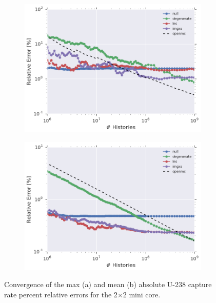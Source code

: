 \documentclass[12pt,twoside]{mitthesis-exec}
\begin{document}
\begin{figure}[h!]
\centering
\begin{subfigure}{\textwidth}
  \centering
  \includegraphics[width=0.9\linewidth]{figures/results/convergence/reflector/max-capt-err-evo-exec-summary}
  \caption{}
  \label{fig:refl-max-converge}
\end{subfigure}
\begin{subfigure}{\textwidth}
  \centering
  \includegraphics[width=0.9\linewidth]{figures/results/convergence/reflector/mean-capt-err-evo-exec-summary}
  \caption{}
  \label{fig:refl-mean-converge}
\end{subfigure}
\vspace{2mm}
\caption[Fission rate covergence for the 2$\times$2 mini core]{Convergence of the max (a) and mean (b) absolute U-238 capture rate percent relative errors for the 2$\times$2 mini core.}
\label{fig:refl-capture-converge}
\end{figure}
\end{document}
